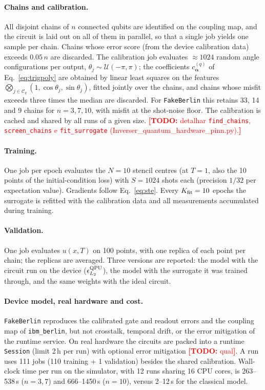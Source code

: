 \documentclass[floatfix,aps,pra,twocolumn,showpacs,superscriptaddress,10pt,nofootinbib]{revtex4-2}
\newif\ifshowtodos \showtodostrue
\newcommand{\TODO}[1]{\ifshowtodos\textcolor{red}{\textbf{[TODO:} #1\textbf{]}}\fi}
\begin{document}
\begin{appendices}
\paragraph{Chains and calibration.} All disjoint chains of $n$ connected qubits are identified on the coupling map, and the circuit is laid out on all of them in parallel, so that a single job yields one sample per chain. Chains whose error score (from the device calibration data) exceeds $0.05\,n$ are discarded. The calibration job evaluates $\approx1024$ random angle configurations per output, $\theta_j\sim\mathcal U(-\pi,\pi)$; the coefficients $c^{(q)}_{\bm\alpha}$ of Eq.~\eqref{eq:trigpoly} are obtained by linear least squares on the features $\bigotimes_{j\in\mathcal C_q}(1,\cos\theta_j,\sin\theta_j)$, fitted jointly over the chains, and chains whose misfit exceeds three times the median are discarded. For \texttt{FakeBerlin} this retains 33, 14 and 9 chains for $n=3,7,10$, with misfit at the shot-noise floor. The calibration is cached and shared by all runs of a given size. \TODO{detalhar \texttt{find\_chains}, \texttt{screen\_chains} e \texttt{fit\_surrogate} (Inverser\_quantum\_hardware\_pinn.py).}

\paragraph{Training.} One job per epoch evaluates the $N=10$ stencil centres (at $T=1$, also the 10 points of the initial-condition loss) with $S=1024$ shots each (precision $1/32$ per expectation value). Gradients follow Eq.~\eqref{eq:ste}. Every $K_{\rm fit}=10$ epochs the surrogate is refitted with the calibration data and all measurements accumulated during training.

\paragraph{Validation.} One job evaluates $u(x,T)$ on 100 points, with one replica of each point per chain; the replicas are averaged. Three versions are reported: the model with the circuit run on the device ($\epsilon_{L_2}^{\rm QPU}$), the model with the surrogate it was trained through, and the same weights with the ideal circuit.

\paragraph{Device model, real hardware and cost.} \texttt{FakeBerlin} reproduces the calibrated gate and readout errors and the coupling map of \texttt{ibm\_berlin}, but not crosstalk, temporal drift, or the error mitigation of the runtime service. On real hardware the circuits are packed into a runtime \texttt{Session} (limit 2\,h per run) with optional error mitigation \TODO{qual}. A run uses 111 jobs (110 training + 1 validation) besides the shared calibration. Wall-clock time per run on the simulator, with 12 runs sharing 16 CPU cores, is 263--538\,s ($n=3,7$) and 666--1450\,s ($n=10$), versus 2--12\,s for the classical model.


\end{appendices}
\end{document}
